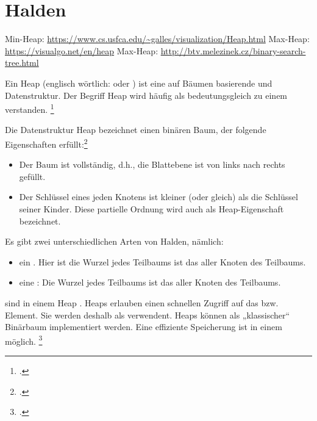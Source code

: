 \documentclass{lehramt-informatik}
\begin{document}

\chapter{Halden}

\begin{quellen}
\item \cite[Seite 25-32]{aud:fs:tafeluebung-11}
\item \cite{wiki:heap}
\item \cite[Seite 407-409 (PDF 423-425), Kapitel 14.6.1]{saake}
\end{quellen}

Min-Heap: \url{https://www.cs.usfca.edu/~galles/visualization/Heap.html}
Max-Heap: \url{https://visualgo.net/en/heap}
Max-Heap: \url{http://btv.melezinek.cz/binary-search-tree.html}

\noindent
Ein Heap (englisch wörtlich:  oder ) ist
eine auf Bäumen basierende  und
 Datenstruktur.
%
Der Begriff Heap wird häufig als bedeutungsgleich zu einem
 verstanden.
\footcite{wiki:heap}

Die Datenstruktur Heap bezeichnet einen binären Baum, der folgende
Eigenschaften erfüllt:\footcite[Seite 407 (PDF 423), Kapitel 14.6.1]{saake}

\begin{itemize}
\item Der Baum ist vollständig, d.h., die Blattebene ist von links nach
rechts gefüllt.

\item Der Schlüssel eines jeden Knotens ist kleiner (oder gleich) als
die Schlüssel seiner Kinder. Diese partielle Ordnung wird auch als
Heap-Eigenschaft bezeichnet.
\end{itemize}

%
Es gibt zwei unterschiedlichen Arten von Halden, nämlich:

\begin{itemize}
\item ein . Hier ist die Wurzel jedes Teilbaums ist das
 aller Knoten des Teilbaums.
%
\item eine : Die Wurzel jedes Teilbaums ist das
 aller Knoten des Teilbaums.
\end{itemize}
%
 sind in einem Heap .
%
Heaps erlauben einen schnellen Zugriff auf das  bzw.
 Element. Sie werden deshalb als
 verwendent.
%
Heaps können als „klassischer“ Binärbaum implementiert werden. Eine
effiziente Speicherung ist in einem  möglich.
\footcite[Seite 22]{aud:fs:tafeluebung-11}
\end{document}
